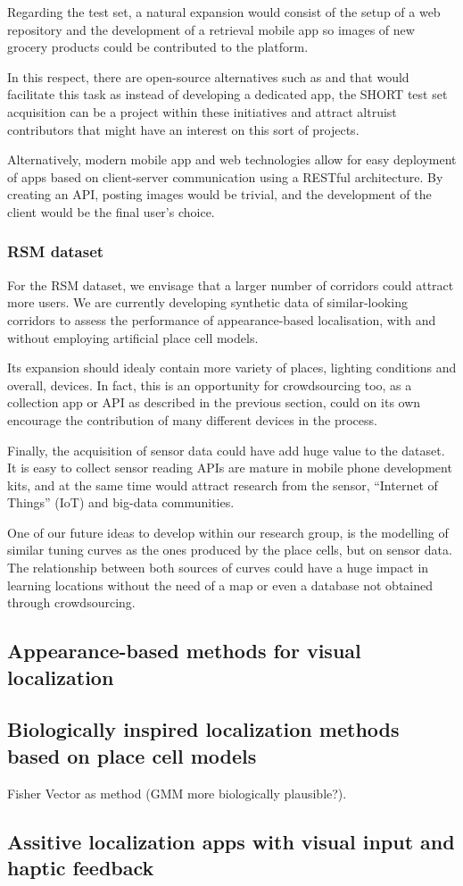 Regarding the test set, a natural expansion would consist of the setup of a web repository and the development of a retrieval mobile app so images of new grocery products could be contributed to the platform.

In this respect, there are open-source alternatives such as \cite{apple} and \cite{google} that would facilitate this task as instead of developing a dedicated app, the SHORT test set acquisition can be a project within these initiatives and attract altruist contributors that might have an interest on this sort of projects.

Alternatively, modern mobile app and web technologies allow for easy deployment of apps based on client-server communication using a RESTful architecture. By creating an API, posting images would be trivial, and the development of the client would be the final user's choice.

\subsubsection{RSM dataset}

For the RSM dataset, we envisage that a larger number of corridors could attract more users. We are currently developing synthetic data of similar-looking corridors to assess the performance of appearance-based localisation, with and without employing artificial place cell models.

Its expansion should idealy contain more variety of places, lighting conditions and overall, devices. In fact, this is an opportunity for crowdsourcing too, as a collection app or API as described in the previous section, could on its own encourage the contribution of many different devices in the process.

Finally, the acquisition of sensor data could have add huge value to the dataset. It is easy to collect sensor reading APIs are mature in mobile phone development kits, and at the same time would attract research from the sensor, ``Internet of Things'' (IoT) and big-data communities.

One of our future ideas to develop within our research group, is the modelling of similar tuning curves as the ones produced by the place cells, but on sensor data. The relationship between both sources of curves could have a huge impact in learning locations without the need of a map or even a database not obtained through crowdsourcing.

\subsection{Appearance-based methods for visual localization}

\subsection{Biologically inspired localization methods based on place cell models}
Fisher Vector as method (GMM more biologically plausible?).
\subsection{Assitive localization apps with visual input and haptic feedback}


